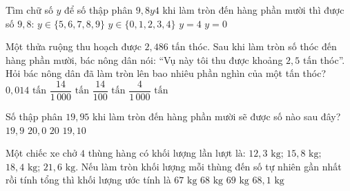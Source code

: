 \begin{ex} %
Tìm chữ số $y$ để số thập phân $9{,}8y4$ khi làm tròn đến hàng phần mười thì được số $9{,}8$:
\choice
{$y \in \{5, 6, 7, 8, 9\}$}
{\True $y \in \{0, 1, 2, 3, 4\}$}
{$y = 4$}
{$y = 0$}
\end{ex}

\begin{ex} %
Một thửa ruộng thu hoạch được $2{,}486\text{ tấn}$ thóc. Sau khi làm tròn số thóc đến hàng phần mười, bác nông dân nói: ``Vụ này tôi thu được khoảng $2{,}5\text{ tấn}$ thóc''. Hỏi bác nông dân đã làm tròn lên bao nhiêu phần nghìn của một tấn thóc?
\choice
{$0{,}014\text{ tấn}$}
{\True $\dfrac{14}{1\,000}\text{ tấn}$}
{$\dfrac{14}{100}\text{ tấn}$}
{$\dfrac{4}{1\,000}\text{ tấn}$}
\end{ex}

\begin{ex} %
Số thập phân $19{,}95$ khi làm tròn đến hàng phần mười sẽ được số nào sau đây?
\choice
{$19{,}9$}
{\True $20{,}0$}
{$20$}
{$19{,}10$}
\end{ex}

\begin{ex} %
Một chiếc xe chở $4$ thùng hàng có khối lượng lần lượt là: $12{,}3\text{ kg}$; $15{,}8\text{ kg}$; $18{,}4\text{ kg}$; $21{,}6\text{ kg}$. Nếu làm tròn khối lượng mỗi thùng đến số tự nhiên gần nhất rồi tính tổng thì khối lượng ước tính là
\choice
{$67\text{ kg}$}
{\True $68\text{ kg}$}
{$69\text{ kg}$}
{$68{,}1\text{ kg}$}
\end{ex}

